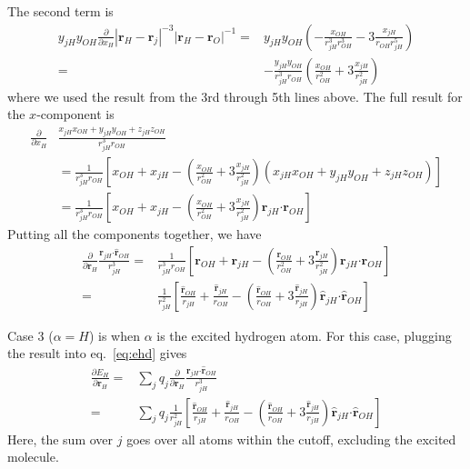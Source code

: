\documentclass{article}
\newcommand{\vect}[1]{\boldsymbol{\mathbf{#1}}}
\begin{document}
The second term is
\begin{align*}
y_{jH}y_{OH}\frac{\partial}{\partial x_H} |\vect r_H-\vect r_j|^{-3}|\vect r_H-\vect r_O|^{-1} =& y_{jH}y_{OH}\left(-\frac{x_{OH}}{r_{jH}^3r_{OH}^3} -3\frac{x_{jH}}{r_{OH}r_{jH}^5}\right) \\
=&-\frac{y_{jH}y_{OH}}{r_{jH}^3r_{OH}} \left(\frac{x_{OH}}{r_{OH}^2} +3\frac{x_{jH}}{r_{jH}^2} \right)
\end{align*}
where we used the result from the 3rd through 5th lines above.
The full result for the $x$-component is
\begin{align*}
\frac{\partial}{\partial x_H} &\frac{x_{jH}x_{OH}+y_{jH}y_{OH} + z_{jH}z_{OH}}{r_{jH}^3r_{OH}} \\
&= \frac{1}{r_{jH}^3r_{OH}} \left[x_{OH} + x_{jH} - \left(\frac{x_{OH}}{r_{OH}^2} +3\frac{x_{jH}}{r_{jH}^2}\right) \left( x_{jH} x_{OH}+y_{jH}y_{OH} +z_{jH}z_{OH}  \right) \right] \\
&= \frac{1}{r_{jH}^3r_{OH}} \left[x_{OH} + x_{jH} - \left(\frac{x_{OH}}{r_{OH}^2} +3\frac{x_{jH}}{r_{jH}^2}\right) \vect{r}_{jH}\vect\cdot\vect{r}_{OH} \right]
\end{align*}
Putting all the components together, we have
\begin{align*}
\frac{\partial}{\partial \vect r_H} \frac{\vect{r}_{jH}\vect\cdot\vect{\hat r}_{OH} }{r_{jH}^3} =& \frac{1}{r_{jH}^3r_{OH}} \left[\vect{r}_{OH} + \vect{r}_{jH} - \left(\frac{\vect{r}_{OH}}{r_{OH}^2} +3\frac{\vect{r}_{jH}}{r_{jH}^2}\right) \vect{r}_{jH}\vect\cdot\vect{r}_{OH} \right] \\
=& \frac{1}{r_{jH}^2} \left[\frac{\vect{\hat r}_{OH}}{r_{jH}} + \frac{\vect{\hat r}_{jH}}{r_{OH}} - \left(\frac{\vect{\hat r}_{OH}}{r_{OH}} +3\frac{\vect{\hat r}_{jH}}{r_{jH}}\right) \vect{\hat r}_{jH}\vect\cdot\vect{\hat r}_{OH} \right]
\end{align*}

Case 3 ($\alpha=H$) is when $\alpha$ is the excited hydrogen atom.
For this case, plugging the result into eq.~\ref{eq:ehd} gives
\begin{align}
\frac{\partial E_H}{\partial \vect r_H} =& \sum_j q_j \frac{\partial}{\partial \vect r_H} \frac{\vect{r}_{jH}\vect\cdot\vect{\hat r}_{OH} }{r_{jH}^3} \\
=& \sum_j q_j \frac{1}{r_{jH}^2} \left[\frac{\vect{\hat r}_{OH}}{r_{jH}} + \frac{\vect{\hat r}_{jH}}{r_{OH}} - \left(\frac{\vect{\hat r}_{OH}}{r_{OH}} +3\frac{\vect{\hat r}_{jH}}{r_{jH}}\right) \vect{\hat r}_{jH}\vect\cdot\vect{\hat r}_{OH} \right]
\end{align}
Here, the sum over $j$ goes over all atoms within the cutoff, excluding the excited molecule.
\end{document}
